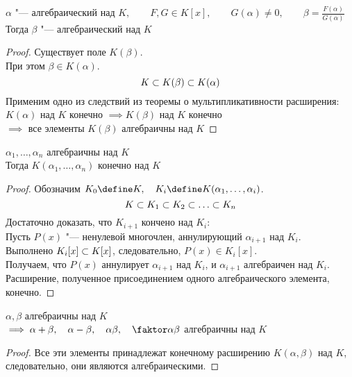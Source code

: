 \begin{implication}
	$ \alpha $ "--- алгебраический над $ K, \qquad F, G \in K[x], \qquad G(\alpha) \ne 0, \qquad \beta = \frac{F(\alpha)}{G(\alpha)} $ \\
	Тогда $ \beta $ "--- алгебраический над $ K $
\end{implication}

\begin{proof}
	Существует поле $ K(\beta) $. \\
	При этом $ \beta \in K(\alpha) $.
	$$ K \subset K(\beta) \subset K(\alpha) $$
	Применим одно из следствий из теоремы о мультипликативности расширения: \\
	$ K(\alpha) $ над $ K $ конечно $ \implies K(\beta) $ над $ K $ конечно \\
	$ \implies $ все элементы $ K(\beta) $ алгебраичны над $ K $
\end{proof}

\begin{implication}
	$ \alpha_1, \dots, \alpha_n $ алгебраичны над $ K $ \\
	Тогда $ K(\alpha_1, \dots, \alpha_n) $ конечно над $ K $
\end{implication}

\begin{proof}
	Обозначим $ K_0 \define K, \quad K_i \define K(\alpha_1, \dots, \alpha_i) $.
	$$ K \sub K_1 \sub K_2 \sub \dots \sub K_n $$
	Достаточно доказать, что $ K_{i + 1} $ кончено над $ K_i $: \\
	Пусть $ P(x) $ "--- ненулевой многочлен, аннулирующий $ \alpha_{i + 1} $ над $ K_i $. \\
	Выполнено $ K_i[x] \subset K[x] $, следовательно, $ P(x) \in K_i[x] $. \\
	Получаем, что $ P(x) $ аннулирует $ \alpha_{i + 1} $ над $ K_i $, и $ \alpha_{i + 1} $ алгебраичен над $ K_i $. \\
	Расширение, полученное присоединением одного алгебраического элемента, конечно.
\end{proof}

\begin{implication}
	$ \alpha, \beta $ алгебраичны над $ K $ \\
	$ \implies \alpha + \beta, \quad \alpha - \beta, \quad \alpha \beta, \quad \faktor\alpha\beta $ алгебраичны над $ K $
\end{implication}

\begin{proof}
	Все эти элементы принадлежат конечному расширению $ K(\alpha, \beta) $ над $ K $, следовательно, они являются алгебраическими.
\end{proof}

